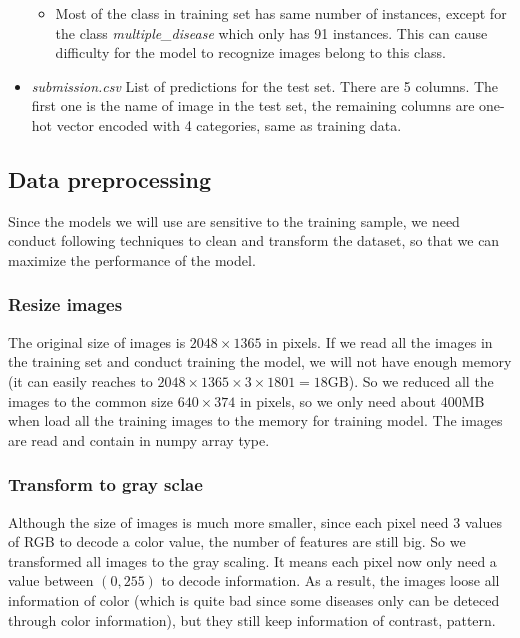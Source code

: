\documentclass[12pt, a4paper]{article}
\begin{document}
\begin{itemize}
\begin{itemize}
		\item Most of the class in training set has same number of instances, except for the class \emph{multiple\_disease} which only has 91 instances. This can cause difficulty for the model to recognize images belong to this class.
		\end{itemize}
		
		\item \emph{submission.csv} List of predictions for the test set. There are 5 columns. The first one is the name of image in the test set, the remaining columns are one-hot vector encoded with 4 categories, same as training data. 
		
	\end{itemize}
	
	\subsection{Data preprocessing}
	
	Since the models we will use are sensitive to the training sample, we need conduct following techniques to clean and transform the dataset, so that we can maximize the performance of the model.
	
	\subsubsection{Resize images}
	
	The original size of images is $2048 \times 1365$ in pixels. If we read all the images in the training set and conduct training the model, we will not have enough memory (it can easily reaches to $2048 \times 1365 \times 3 \times 1801 = 18 \text{GB}$). So we reduced all the images to the common size $640 \times 374$ in pixels, so we only need about 400MB when load all the training images to the memory for training model. The images are read and contain in numpy array type.
	
	\subsubsection{Transform to gray sclae}
	
	Although the size of images is much more smaller, since each pixel need 3 values of RGB to decode a color value, the number of features are still big. So we transformed all images to the gray scaling. It means each pixel now only need a value between $(0, 255)$ to decode information. As a result, the images loose all information of color (which is quite bad since some diseases only can be deteced through color information), but they still keep information of contrast, pattern.
	
\end{document}
